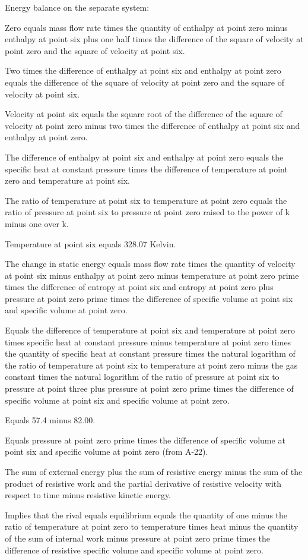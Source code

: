 Energy balance on the separate system:

Zero equals mass flow rate times the quantity of enthalpy at point zero minus enthalpy at point six plus one half times the difference of the square of velocity at point zero and the square of velocity at point six.

Two times the difference of enthalpy at point six and enthalpy at point zero equals the difference of the square of velocity at point zero and the square of velocity at point six.

Velocity at point six equals the square root of the difference of the square of velocity at point zero minus two times the difference of enthalpy at point six and enthalpy at point zero.

The difference of enthalpy at point six and enthalpy at point zero equals the specific heat at constant pressure times the difference of temperature at point zero and temperature at point six.

The ratio of temperature at point six to temperature at point zero equals the ratio of pressure at point six to pressure at point zero raised to the power of k minus one over k.

Temperature at point six equals 328.07 Kelvin.

The change in static energy equals mass flow rate times the quantity of velocity at point six minus enthalpy at point zero minus temperature at point zero prime times the difference of entropy at point six and entropy at point zero plus pressure at point zero prime times the difference of specific volume at point six and specific volume at point zero.

Equals the difference of temperature at point six and temperature at point zero times specific heat at constant pressure minus temperature at point zero times the quantity of specific heat at constant pressure times the natural logarithm of the ratio of temperature at point six to temperature at point zero minus the gas constant times the natural logarithm of the ratio of pressure at point six to pressure at point three plus pressure at point zero prime times the difference of specific volume at point six and specific volume at point zero.

Equals 57.4 minus 82.00.

Equals pressure at point zero prime times the difference of specific volume at point six and specific volume at point zero (from A-22).

The sum of external energy plus the sum of resistive energy minus the sum of the product of resistive work and the partial derivative of resistive velocity with respect to time minus resistive kinetic energy.

Implies that the rival equals equilibrium equals the quantity of one minus the ratio of temperature at point zero to temperature times heat minus the quantity of the sum of internal work minus pressure at point zero prime times the difference of resistive specific volume and specific volume at point zero.